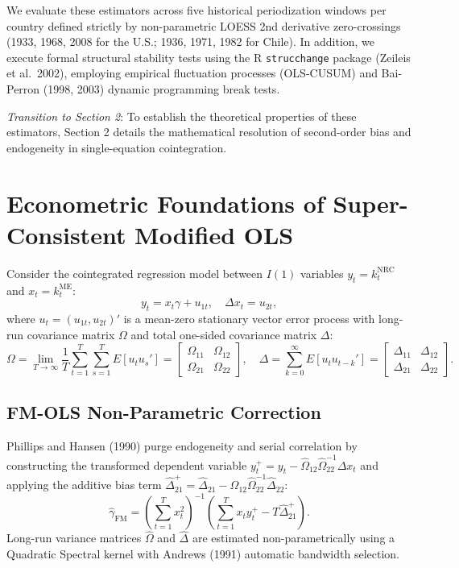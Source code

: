 \documentclass[11pt,a4paper]{article}
\begin{document}
We evaluate these estimators across five historical periodization windows per country defined strictly by non-parametric LOESS 2nd derivative zero-crossings ({1933, 1968, 2008} for the U.S.; {1936, 1971, 1982} for Chile). In addition, we execute formal structural stability tests using the R \texttt{strucchange} package (Zeileis et al.\ 2002), employing empirical fluctuation processes (OLS-CUSUM) and Bai-Perron (1998, 2003) dynamic programming break tests.

\textit{Transition to Section 2}: To establish the theoretical properties of these estimators, Section 2 details the mathematical resolution of second-order bias and endogeneity in single-equation cointegration.

\FloatBarrier
\section{Econometric Foundations of Super-Consistent Modified OLS}

Consider the cointegrated regression model between $I(1)$ variables $y_t = k_t^{\text{NRC}}$ and $x_t = k_t^{\text{ME}}$:
\begin{equation}
y_t = x_t \gamma + u_{1t}, \quad \Delta x_t = u_{2t},
\end{equation}
where $u_t = (u_{1t}, u_{2t})'$ is a mean-zero stationary vector error process with long-run covariance matrix $\Omega$ and total one-sided covariance matrix $\Delta$:
\begin{equation}
\Omega = \lim_{T \to \infty} \frac{1}{T} \sum_{t=1}^T \sum_{s=1}^T E[u_t u_s'] = \begin{bmatrix} \Omega_{11} & \Omega_{12} \\ \Omega_{21} & \Omega_{22} \end{bmatrix}, \quad \Delta = \sum_{k=0}^\infty E[u_t u_{t-k}'] = \begin{bmatrix} \Delta_{11} & \Delta_{12} \\ \Delta_{21} & \Delta_{22} \end{bmatrix}.
\end{equation}

\subsection{FM-OLS Non-Parametric Correction}
Phillips and Hansen (1990) purge endogeneity and serial correlation by constructing the transformed dependent variable $y_t^+ = y_t - \hat{\Omega}_{12} \hat{\Omega}_{22}^{-1} \Delta x_t$ and applying the additive bias term $\hat{\Delta}_{21}^+ = \hat{\Delta}_{21} - \hat{\Omega}_{12} \hat{\Omega}_{22}^{-1} \hat{\Delta}_{22}$:
\begin{equation}
\hat{\gamma}_{\text{FM}} = \left( \sum_{t=1}^T x_t^2 \right)^{-1} \left( \sum_{t=1}^T x_t y_t^+ - T \hat{\Delta}_{21}^+ \right).
\end{equation}
Long-run variance matrices $\hat{\Omega}$ and $\hat{\Delta}$ are estimated non-parametrically using a Quadratic Spectral kernel with Andrews (1991) automatic bandwidth selection.
\end{document}
